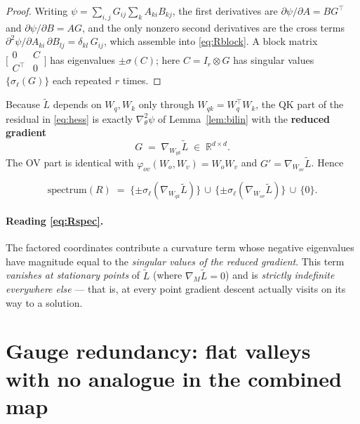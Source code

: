 \documentclass[11pt]{article}
\theoremstyle{remark}
\newcommand{\R}{\mathbb{R}}
\newcommand{\Wqk}{W_{qk}}
\newcommand{\Wov}{W_{ov}}
\newcommand{\Wq}{W_{q}}
\newcommand{\Wk}{W_{k}}
\newcommand{\Wo}{W_{o}}
\newcommand{\Wv}{W_{v}}
\newcommand{\Hess}{\nabla^2}
\begin{document}
\begin{proof}
Writing $\psi=\sum_{i,j}G_{ij}\sum_{k}A_{ki}B_{kj}$, the first derivatives are
$\partial\psi/\partial A = BG^{\!\top}$ and $\partial\psi/\partial B = AG$, and the
only nonzero second derivatives are the cross terms
$\partial^2\psi/\partial A_{ki}\,\partial B_{lj}=\delta_{kl}\,G_{ij}$, which
assemble into \eqref{eq:Rblock}. A block matrix
$\bigl[\begin{smallmatrix}0&C\\ C^{\!\top}&0\end{smallmatrix}\bigr]$ has
eigenvalues $\pm\sigma(C)$; here $C=I_r\otimes G$ has singular values
$\{\sigma_\ell(G)\}$ each repeated $r$ times.
\end{proof}

Because $\widetilde L$ depends on $\Wq,\Wk$ only through $\Wqk=\Wq^{\!\top}\Wk$, the
QK part of the residual in \eqref{eq:hess} is exactly $\Hess_\theta\psi$ of
Lemma~\ref{lem:bilin} with the \textbf{reduced gradient}
\begin{equation}\label{eq:redgrad}
G \;=\; \nabla_{\Wqk}\widetilde L \;\in\;\R^{d\times d}.
\end{equation}
The OV part is identical with $\varphi_{ov}(\Wo,\Wv)=\Wo\Wv$ and
$G'=\nabla_{\Wov}\widetilde L$. Hence

\begin{equation}\label{eq:Rspec}
\text{spectrum}(R)\;=\;\{\pm\sigma_\ell(\nabla_{\Wqk}\widetilde L)\}
                    \,\cup\,\{\pm\sigma_\ell(\nabla_{\Wov}\widetilde L)\}\,\cup\,\{0\}.
\end{equation}

\paragraph{Reading \eqref{eq:Rspec}.}
The factored coordinates contribute a curvature term whose negative eigenvalues
have magnitude equal to the \emph{singular values of the reduced gradient}. This
term \emph{vanishes at stationary points} of $\widetilde L$ (where
$\nabla_M\widetilde L=0$) and is \emph{strictly indefinite everywhere else} ---
that is, at every point gradient descent actually visits on its way to a
solution.

\section{Gauge redundancy: flat valleys with no analogue in the combined map}
\end{document}
